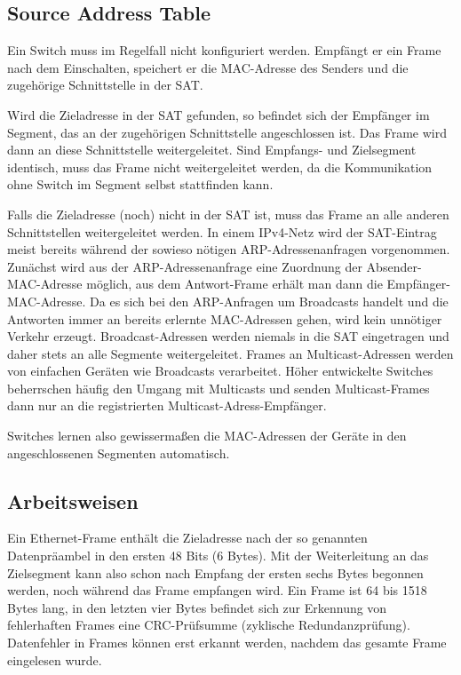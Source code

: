 \subsection{Source Address Table}
Ein Switch muss im Regelfall nicht konfiguriert werden. Empfängt er ein Frame nach dem Einschalten, speichert er die MAC-Adresse des Senders und die zugehörige Schnittstelle in der SAT.

Wird die Zieladresse in der SAT gefunden, so befindet sich der Empfänger im Segment, das an der zugehörigen Schnittstelle angeschlossen ist. Das Frame wird dann an diese Schnittstelle weitergeleitet. Sind Empfangs- und Zielsegment identisch, muss das Frame nicht weitergeleitet werden, da die Kommunikation ohne Switch im Segment selbst stattfinden kann.

Falls die Zieladresse (noch) nicht in der SAT ist, muss das Frame an alle anderen Schnittstellen weitergeleitet werden. In einem IPv4-Netz wird der SAT-Eintrag meist bereits während der sowieso nötigen ARP-Adressenanfragen vorgenommen. Zunächst wird aus der ARP-Adressenanfrage eine Zuordnung der Absender-MAC-Adresse möglich, aus dem Antwort-Frame erhält man dann die Empfänger-MAC-Adresse. Da es sich bei den ARP-Anfragen um Broadcasts handelt und die Antworten immer an bereits erlernte MAC-Adressen gehen, wird kein unnötiger Verkehr erzeugt. Broadcast-Adressen werden niemals in die SAT eingetragen und daher stets an alle Segmente weitergeleitet. Frames an Multicast-Adressen werden von einfachen Geräten wie Broadcasts verarbeitet. Höher entwickelte Switches beherrschen häufig den Umgang mit Multicasts und senden Multicast-Frames dann nur an die registrierten Multicast-Adress-Empfänger.

Switches lernen also gewissermaßen die MAC-Adressen der Geräte in den angeschlossenen Segmenten automatisch.
\subsection{Arbeitsweisen}
Ein Ethernet-Frame enthält die Zieladresse nach der so genannten Datenpräambel in den ersten 48 Bits (6 Bytes). Mit der Weiterleitung an das Zielsegment kann also schon nach Empfang der ersten sechs Bytes begonnen werden, noch während das Frame empfangen wird. Ein Frame ist 64 bis 1518 Bytes lang, in den letzten vier Bytes befindet sich zur Erkennung von fehlerhaften Frames eine CRC-Prüfsumme (zyklische Redundanzprüfung). Datenfehler in Frames können erst erkannt werden, nachdem das gesamte Frame eingelesen wurde.

